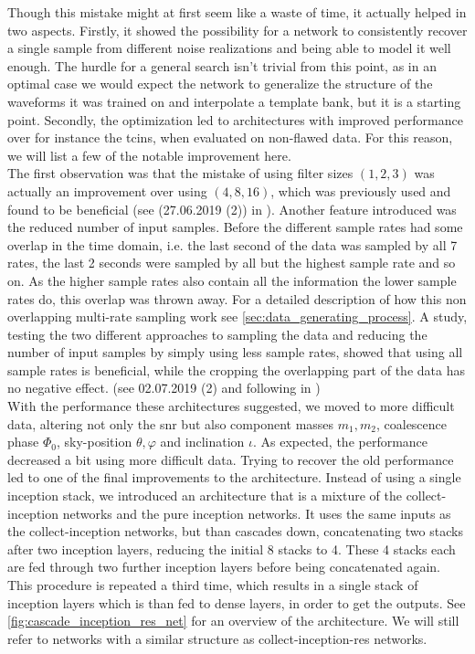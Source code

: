 Though this mistake might at first seem like a waste of time, it actually helped in two aspects. Firstly, it showed the possibility for a network to consistently recover a single sample from different noise realizations and being able to model it well enough. The hurdle for a general search isn't trivial from this point, as in an optimal case we would expect the network to generalize the structure of the waveforms it was trained on and interpolate a template bank, but it is a starting point. Secondly, the optimization led to architectures with improved performance over for instance the \gls{tcin}s, when evaluated on non-flawed data. For this reason, we will list a few of the notable improvement here.\smallskip\\
The first observation was that the mistake of using filter sizes $(1,2,3)$ was actually an improvement over using $(4,8,16)$, which was previously used and found to be beneficial (see (27.06.2019 (2)) in \cite{network_wiki}). Another feature introduced was the reduced number of input samples. Before the different sample rates had some overlap in the time domain, i.e. the last second of the data was sampled by all 7 rates, the last 2 seconds were sampled by all but the highest sample rate and so on. As the higher sample rates also contain all the information the lower sample rates do, this overlap was thrown away. For a detailed description of how this non overlapping multi-rate sampling work see \autoref{sec:data_generating_process}. A study, testing the two different approaches to sampling the data and reducing the number of input samples by simply using less sample rates, showed that using all sample rates is beneficial, while the cropping the overlapping part of the data has no negative effect. (see 02.07.2019 (2) and following in \cite{network_wiki})\\
With the performance these architectures suggested, we moved to more difficult data, altering not only the \gls{snr} but also component masses $m_1, m_2$, coalescence phase $\Phi_0$, sky-position $\theta, \varphi$ and inclination $\iota$. As expected, the performance decreased a bit using more difficult data. Trying to recover the old performance led to one of the final improvements to the architecture. Instead of using a single inception stack, we introduced an architecture that is a mixture of the collect-inception networks and the pure inception networks. It uses the same inputs as the collect-inception networks, but than cascades down, concatenating two stacks after two inception layers, reducing the initial 8 stacks to 4. These 4 stacks each are fed through two further inception layers before being concatenated again. This procedure is repeated a third time, which results in a single stack of inception layers which is than fed to dense layers, in order to get the outputs. See \autoref{fig:cascade_inception_res_net} for an overview of the architecture. We will still refer to networks with a similar structure as collect-inception-res networks.\\
